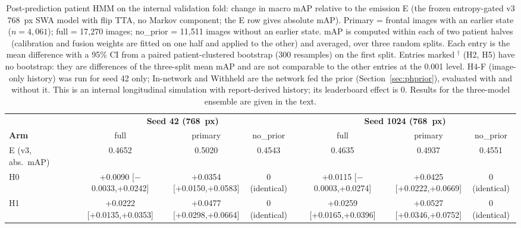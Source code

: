 \documentclass[conference]{IEEEtran}
\begin{document}
\begin{table}[htbp]
\caption{Post-prediction patient HMM on the internal validation fold: change in macro mAP relative to the emission E (the frozen entropy-gated v3 768~px SWA model with flip TTA, no Markov component; the E row gives absolute mAP). Primary = frontal images with an earlier state ($n = 4{,}061$); full = 17,270 images; no\_prior = 11,511 images without an earlier state. mAP is computed within each of two patient halves (calibration and fusion weights are fitted on one half and applied to the other) and averaged, over three random splits. Each entry is the mean difference with a 95\% CI from a paired patient-clustered bootstrap (300 resamples) on the first split. Entries marked $^\dagger$ (H2, H5) have no bootstrap: they are differences of the three-split mean mAP and are not comparable to the other entries at the 0.001 level. H4-F (image-only history) was run for seed 42 only; In-network and Withheld are the network fed the prior (Section~\ref{sec:phprior}), evaluated with and without it. This is an internal longitudinal simulation with report-derived history; its leaderboard effect is 0. Results for the three-model ensemble are given in the text.}
\begin{center}
\footnotesize
\setlength{\tabcolsep}{3pt}
\begin{tabular}{|l|c|c|c|c|c|c|}
\hline
 & \multicolumn{3}{c|}{\textbf{Seed 42 (768~px)}} & \multicolumn{3}{c|}{\textbf{Seed 1024 (768~px)}} \\
\textbf{Arm} & full & primary & no\_prior & full & primary & no\_prior \\
\hline
E (v3, abs.\ mAP) & 0.4652 & 0.5020 & 0.4543 & 0.4635 & 0.4937 & 0.4551 \\
\hline
H0 & \shortstack{+0.0090\\{[$-$0.0033,+0.0242]}} & \shortstack{+0.0354\\{[+0.0150,+0.0583]}} & 0 (identical) & \shortstack{+0.0115\\{[$-$0.0003,+0.0274]}} & \shortstack{+0.0425\\{[+0.0222,+0.0669]}} & 0 (identical) \\
H1 & \shortstack{+0.0222\\{[+0.0135,+0.0353]}} & \shortstack{+0.0477\\{[+0.0298,+0.0664]}} & 0 (identical) & \shortstack{+0.0259\\{[+0.0165,+0.0396]}} & \shortstack{+0.0527\\{[+0.0346,+0.0752]}} & 0 (identical) \\

\end{tabular}
\end{center}
\end{table}
\end{document}
